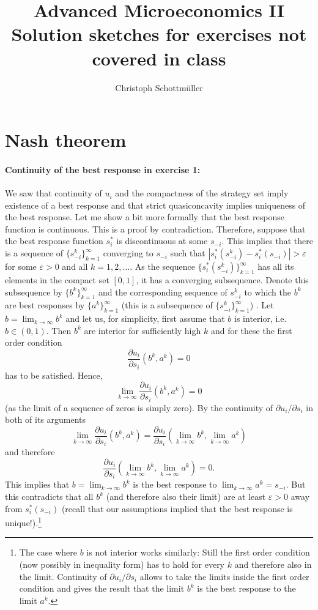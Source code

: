 \documentclass[a4paper,11pt]{article}
\title{Advanced Microeconomics II\\ Solution sketches for exercises not covered in class}
\author{Christoph Schottmüller}
\begin{document}
\maketitle

\section{Nash theorem}
\label{sec:nash-theorem}

\paragraph{Continuity of the best response in exercise 1:} We saw that continuity of $u_i$ and the compactness of the strategy set imply existence of a best response and that strict quasiconcavity implies uniqueness of the best response. Let me show a bit more formally that the best response function is continuous. This is a proof by contradiction. Therefore, suppose that the best response function $s_i^*$ is discontinuous at some $s_{-i}$. This implies that there is a sequence of $\{s_{-i}^k\}_{k=1}^\infty$ converging to $s_{-i}$ such that $|s_{i}^*(s_{-i}^k)-s_i^*(s_{-i})|>\varepsilon $ for some $\varepsilon >0$ and all $k=1,2,\dots$. As the sequence $\{s_i^*(s_{-i}^k)\}_{k=1}^{\infty}$ has all its elements in the compact set $[0,1]$, it has a converging subsequence. Denote this subsequence by $\{ b^k\}_{k=1}^\infty$ and the corresponding sequence of $s_{-i}^k$ to which the $b^k$ are best responses by $\{a^k\}_{k=1}^\infty$ (this is a subsequence of  $\{s_{-i}^k\}_{k=1}^\infty$) . Let $b=\lim_{k\rightarrow\infty}b^k$ and let us, for simplicity, first assume that $b$ is interior, i.e. $b\in(0,1)$. Then $b^k$ are interior for sufficiently high $k$ and for these the first order condition
$$\frac{\partial u_i}{\partial s_i }(b^k,a^k)=0$$
has to be satisfied. Hence,
$$\lim_{k\rightarrow\infty}\frac{\partial u_i}{\partial s_i }(b^k,a^k)=0$$
(as the limit of a sequence of zeros is simply zero).
By the continuity of $\partial u_i/\partial s_i$ in both of its arguments
$$\lim_{k\rightarrow\infty}\frac{\partial u_i}{\partial s_i }(b^k,a^k)=\frac{\partial u_i}{\partial s_i }(\lim_{k\rightarrow\infty}b^k,\lim_{k\rightarrow\infty}a^k)$$
and therefore
$$\frac{\partial u_i}{\partial s_i }(\lim_{k\rightarrow\infty}b^k,\lim_{k\rightarrow\infty}a^k)=0.$$
This implies that $b=\lim_{k\rightarrow\infty}b^k$ is the best response to $\lim_{k\rightarrow\infty}a^k=s_{-i}$. But this contradicts that all $b^k$ (and therefore also their limit) are at least $\varepsilon>0 $ away from $s_i^*(s_{-i})$ (recall that our assumptions implied that the best response is unique!).\footnote{The case where $b$ is not interior works similarly: Still the first order condition (now possibly in inequality form) has to hold for every $k$ and therefore also in the limit. Continuity of $\partial u_i/\partial s_i$ allows to take the limits inside the first order condition and gives the result that the limit $b^k$ is the best response to the limit $a^k$.}
\end{document}
